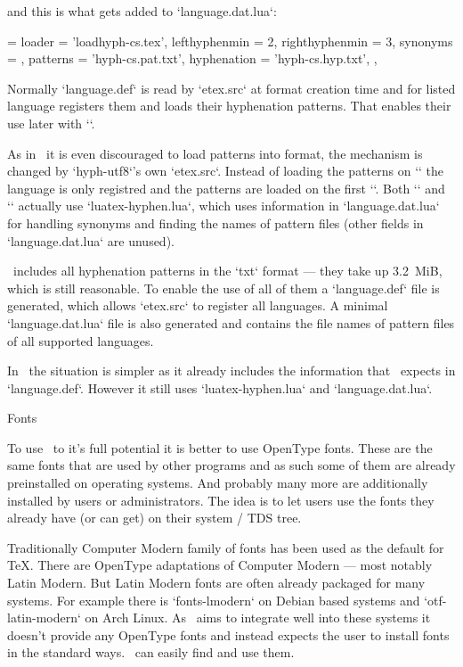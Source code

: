 and this is what gets added to `language.dat.lua`:

\begtt
	['czech'] = {
		loader = 'loadhyph-cs.tex',
		lefthyphenmin = 2,
		righthyphenmin = 3,
		synonyms = {  },
		patterns = 'hyph-cs.pat.txt',
		hyphenation = 'hyph-cs.hyp.txt',
	},
\endtt

Normally `language.def` is read by `etex.src` at format creation time and for
listed language registers them and loads their hyphenation patterns. That
enables their use later with `\uselanguage`.

As in \LuaTeX\ it is even discouraged to load patterns into format, the
mechanism is changed by `hyph-utf8`'s own `etex.src`. Instead of loading the
patterns on `\addlanguage` the language is only registred and the patterns are
loaded on the first `\uselanguage`. Both `\addlanguage` and `\uselangauge`
actually use `luatex-hyphen.lua`, which uses information in `language.dat.lua`
for handling synonyms and finding the names of pattern files (other fields in
`language.dat.lua` are unused).

\MMTeX\ includes all hyphenation patterns in the `txt` format --- they take up
3.2\ MiB, which is still reasonable. To enable the use of all of them a
`language.def` file is generated, which allows `etex.src` to register all
languages. A minimal `language.dat.lua` file is also generated and contains the
file names of pattern files of all supported languages.

In \OpTeX\ the situation is simpler as it already includes the information that
\eTeX\ expects in  `language.def`. However it still uses `luatex-hyphen.lua`
and `language.dat.lua`.

\sec Fonts

To use \LuaTeX\ to it's full potential it is better to use OpenType fonts.
These are the same fonts that are used by other programs and as such some of
them are already preinstalled on operating systems. And probably many more are
additionally installed by users or administrators. The idea is to let users use
the fonts they already have (or can get) on their system / TDS tree.

Traditionally Computer Modern family of fonts has been used as the default for
\TeX. There are OpenType adaptations of Computer Modern --- most notably Latin
Modern. But Latin Modern fonts are often already packaged for many systems. For
example there is `fonts-lmodern` on Debian based systems and `otf-latin-modern`
on Arch Linux. As \MMTeX\ aims to integrate well into these systems it doesn't
provide any OpenType fonts and instead expects the user to install fonts in the
standard ways. \MMTeX\ can easily find and use them.

